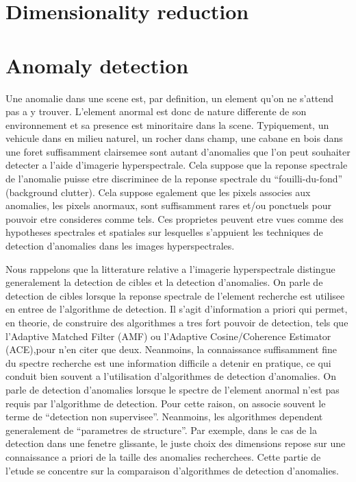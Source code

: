 \section{Dimensionality reduction}

\section{Anomaly detection}
Une anomalie dans une scene est, par definition, un element qu'on ne
s'attend pas a y trouver. L'element anormal est donc de nature
differente de son environnement et sa presence est minoritaire dans la
scene. Typiquement, un vehicule dans en milieu naturel, un rocher dans
champ, une cabane en bois dans une foret suffisamment clairsemee sont
autant d'anomalies que l'on peut souhaiter detecter a l'aide
d'imagerie hyperspectrale. Cela suppose que la reponse spectrale de
l'anomalie puisse etre discriminee de la reponse spectrale du
``fouilli-du-fond'' (background clutter). Cela suppose egalement que
les pixels associes aux anomalies, les pixels anormaux, sont
suffisamment rares et/ou ponctuels pour pouvoir etre consideres comme
tels. Ces proprietes peuvent etre vues comme des hypotheses spectrales
et spatiales sur lesquelles s'appuient les techniques de detection
d'anomalies dans les images hyperspectrales.

Nous rappelons que la litterature relative a l'imagerie hyperspectrale
distingue generalement la detection de cibles et la detection
d'anomalies.  On parle de detection de cibles lorsque la reponse
spectrale de l'element recherche est utilisee en entree de
l'algorithme de detection. Il s'agit d'information a priori qui
permet, en theorie, de construire des algorithmes a tres fort pouvoir
de detection, tels que l'Adaptive Matched Filter (AMF) ou l'Adaptive
Cosine/Coherence Estimator (ACE),pour n'en citer que deux. Neanmoins,
la connaissance suffisamment fine du spectre recherche est une
information difficile a detenir en pratique, ce qui conduit bien
souvent a l'utilisation d'algorithmes de detection d'anomalies.  On
parle de detection d'anomalies lorsque le spectre de l'element anormal
n'est pas requis par l'algorithme de detection. Pour cette raison, on
associe souvent le terme de ``detection non supervisee''. Neanmoins,
les algorithmes dependent generalement de ``parametres de
  structure''. Par exemple, dans le cas de la detection dans une
fenetre glissante, le juste choix des dimensions repose sur une
connaissance a priori de la taille des anomalies recherchees. Cette
partie de l'etude se concentre sur la comparaison d'algorithmes de
detection d'anomalies.

